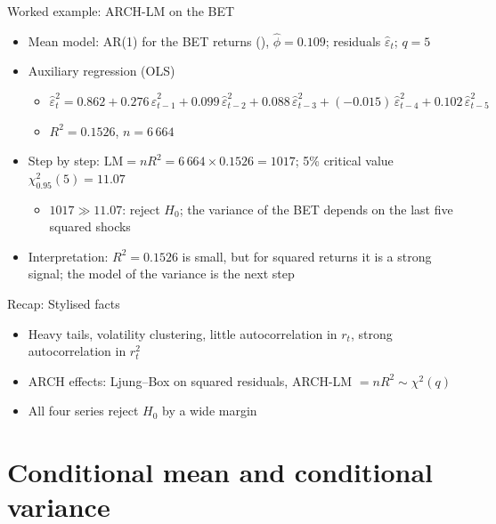 \begin{frame}{Worked example: ARCH-LM on the BET}
\itemsize{\footnotesize}
\begin{itemize}
    \item Mean model: AR(1) for the BET returns (), $\hat\phi = 0.109$; residuals $\hat\varepsilon_t$; $q = 5$
    \item Auxiliary regression (OLS)
    \begin{itemize}
        \item $\hat\varepsilon_t^2 = 0.862 + 0.276\,\hat\varepsilon_{t-1}^2 + 0.099\,\hat\varepsilon_{t-2}^2 + 0.088\,\hat\varepsilon_{t-3}^2 + (\ensuremath{-}0.015)\,\hat\varepsilon_{t-4}^2 + 0.102\,\hat\varepsilon_{t-5}^2$
        \item $R^2 = 0.1526$, $n = 6\,664$
    \end{itemize}
    \item Step by step: $\mathrm{LM} = n R^2 = 6\,664 \times 0.1526 = 1017$; 5\% critical value $\chi^2_{0.95}(5) = 11.07$
    \begin{itemize}
        \item $1017 \gg 11.07$: reject $H_0$; the variance of the BET depends on the last five squared shocks
    \end{itemize}
    \item Interpretation: $R^2 = 0.1526$ is small, but for squared returns it is a strong signal; the model of the variance is the next step
\end{itemize}
\end{frame}

\begin{frame}{Recap: Stylised facts}
\itemsize{\small}
\begin{itemize}
    \item Heavy tails, volatility clustering, little autocorrelation in $r_t$, strong autocorrelation in $r_t^2$
    \item ARCH effects: Ljung--Box on squared residuals, ARCH-LM $= nR^2 \sim \chi^2(q)$
    \item All four series reject $H_0$ by a wide margin
\end{itemize}
\end{frame}


\section{Conditional mean and conditional variance}

